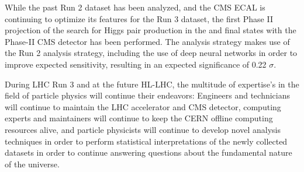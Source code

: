 While the past Run 2 dataset has been analyzed, and the CMS ECAL is continuing to optimize its features for the Run 3 dataset, the first Phase II projection of the search for Higgs pair production in the \wwgg and \ttgg final states with the Phase-II CMS detector has been performed. The analysis strategy makes use of the Run 2 analysis strategy, including the use of deep neural networks in order to improve expected sensitivity, resulting in an expected significance of 0.22 $\sigma$.

During LHC Run 3 and at the future HL-LHC, the multitude of expertise's in the field of particle physics will continue their endeavors: Engineers and technicians will continue to maintain the LHC accelerator and CMS detector, computing experts and maintainers will continue to keep the CERN offline computing resources alive, and particle physicists will continue to develop novel analysis techniques in order to perform statistical interpretations of the newly collected datasets in order to continue answering questions about the fundamental nature of the universe. 